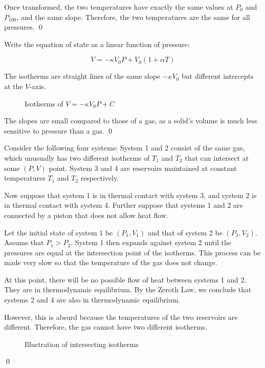 \documentclass[12pt]{article}
\begin{document}
Once transformed, the two temperatures have exactly the same values at $P_{0}$ and $P_{100}$, and the same slope. Therefore, the two temperatures are the same for all pressures.
\qed


Write the equation of state as a linear function of pressure:

\begin{equation}
    V = -\kappa V_{0} P + V_{0} (1 + \alpha T)
\end{equation}

The isotherms are straight lines of the same slope $-\kappa V_{0}$ but different intercepts at the $V$-axis.


\begin{figure}[h]
    \centering
    
    \caption{Isotherms of $V = -\kappa V_{0} P + C$}
\end{figure}

The slopes are small compared to those of a gas, as a solid's volume is much less sensitive to pressure than a gas.
\qed


Consider the following four systems: System 1 and 2 consist of the same gas, which unusually has two different isotherms of $T_{1}$ and $T_{2}$ that can intersect at some $(P, V)$ point. System 3 and 4 are reservoirs maintained at constant temperatures $T_{1}$ and $T_{2}$ respectively.

Now suppose that system 1 is in thermal contact with system 3, and system 2 is in thermal contact with system 4. Further suppose that systems 1 and 2 are connected by a piston that does not allow heat flow.

Let the initial state of system 1 be $(P_{1}, V_{1})$ and that of system 2 be $(P_{2}, V_{2})$. Assume that $P_{1} > P_{2}$. System 1 then expands against system 2 until the pressures are equal at the intersection point of the isotherms. This process can be made very slow so that the temperature of the gas does not change.

At this point, there will be no possible flow of heat between systems 1 and 2. They are in thermodynamic equilibrium. By the Zeroth Law, we conclude that systems 2 and 4 are also in thermodynamic equilibrium.

However, this is absurd because the temperatures of the two reservoirs are different. Therefore, the gas cannot have two different isotherms.

\begin{figure}[h]
    \centering
    
    \caption{Illustration of intersecting isotherms}
\end{figure}
\qed
\end{document}
